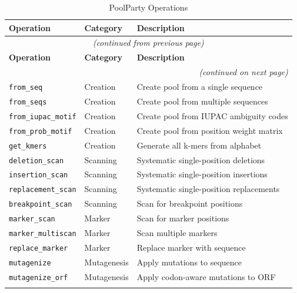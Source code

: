 \documentclass[11pt]{article}
\begin{document}

\begin{longtable}{@{}llp{7cm}@{}}
\caption{PoolParty Operations} \label{tab:poolparty-ops} \\
\toprule
\textbf{Operation} & \textbf{Category} & \textbf{Description} \\
\midrule
\endfirsthead
\multicolumn{3}{c}{\textit{(continued from previous page)}} \\
\toprule
\textbf{Operation} & \textbf{Category} & \textbf{Description} \\
\midrule
\endhead
\midrule
\multicolumn{3}{r}{\textit{(continued on next page)}} \\
\endfoot
\bottomrule
\endlastfoot

\texttt{from_seq} & Creation & Create pool from a single sequence \\
\texttt{from_seqs} & Creation & Create pool from multiple sequences \\
\texttt{from_iupac_motif} & Creation & Create pool from IUPAC ambiguity codes \\
\texttt{from_prob_motif} & Creation & Create pool from position weight matrix \\
\texttt{get_kmers} & Creation & Generate all k-mers from alphabet \\
\addlinespace

\texttt{deletion_scan} & Scanning & Systematic single-position deletions \\
\texttt{insertion_scan} & Scanning & Systematic single-position insertions \\
\texttt{replacement_scan} & Scanning & Systematic single-position replacements \\
\texttt{breakpoint_scan} & Scanning & Scan for breakpoint positions \\
\addlinespace

\texttt{marker_scan} & Marker & Scan for marker positions \\
\texttt{marker_multiscan} & Marker & Scan multiple markers \\
\texttt{replace_marker} & Marker & Replace marker with sequence \\
\addlinespace

\texttt{mutagenize} & Mutagenesis & Apply mutations to sequence \\
\texttt{mutagenize_orf} & Mutagenesis & Apply codon-aware mutations to ORF \\
\addlinespace


\end{longtable}
\end{document}
